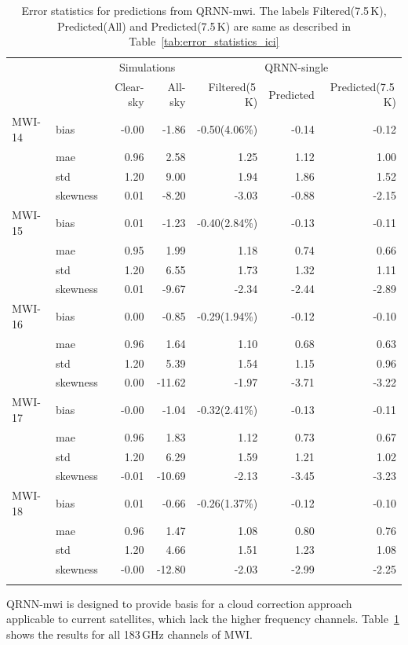 \documentclass[amt, manuscript]{copernicus}
\begin{document}
%
\begin{table}[t]
	\caption{Error statistics for predictions from QRNN-mwi. The labels Filtered(7.5\,K), Predicted(All) and Predicted(7.5\,K) are same as described in Table~\ref{tab:error_statistics_ici}}
	\label{tab:statistics_mwi-alone}
	\begin{tabular}{llrr|rrr}
		\tophline
		&&\multicolumn{2}{c|}{Simulations}& \multicolumn{3}{c}{QRNN-single} \\
		\cline{3-7}
		&&   Clear-sky &   All-sky &  Filtered(5\,K) & Predicted & Predicted(7.5\,K) \\
		\middlehline
		MWI-14 		&bias     & -0.00 & -1.86 & -0.50(4.06\%) & -0.14 & -0.12 \\
					&mae      &  0.96 &  2.58 &  1.25 &  1.12 &  1.00 \\
					&std      &  1.20 &  9.00 &  1.94 &  1.86 &  1.52 \\
					&skewness &  0.01 & -8.20 & -3.03 & -0.88 & -2.15 \\ 
		\middlehline
		MWI-15 		&bias     & 0.01 & -1.23 & -0.40(2.84\%) & -0.13 & -0.11 \\
					&mae      & 0.95 &  1.99 &  1.18 &  0.74 &  0.66 \\
					&std      & 1.20 &  6.55 &  1.73 &  1.32 &  1.11 \\
					&skewness & 0.01 & -9.67 & -2.34 & -2.44 & -2.89 \\
		\middlehline	
		MWI-16 		&bias     & 0.00 &  -0.85 & -0.29(1.94\%) & -0.12 & -0.10 \\
					&mae      & 0.96 &   1.64 &  1.10 &  0.68 &  0.63 \\
					&std      & 1.20 &   5.39 &  1.54 &  1.15 &  0.96 \\
					&skewness & 0.00 & -11.62 & -1.97 & -3.71 & -3.22 \\	
		\middlehline			
		MWI-17 		&bias     & -0.00 &  -1.04 & -0.32(2.41\%) & -0.13 & -0.11 \\
					&mae      &  0.96 &   1.83 &  1.12 &  0.73 &  0.67 \\
					&std      &  1.20 &   6.29 &  1.59 &  1.21 &  1.02 \\
					&skewness & -0.01 & -10.69 & -2.13 & -3.45 & -3.23 \\	
		\middlehline			
		MWI-18 		&bias     &  0.01 &  -0.66 & -0.26(1.37\%) & -0.12 & -0.10 \\
					&mae      &  0.96 &   1.47 &  1.08 &  0.80 &  0.76 \\
					&std      &  1.20 &   4.66 &  1.51 &  1.23 &  1.08 \\
					&skewness & -0.00 & -12.80 & -2.03 & -2.99 & -2.25 \\	
		\bottomhline				
	\end{tabular}	
	\belowtable{} %
\end{table}
QRNN-mwi is designed to provide basis for a cloud correction approach applicable to current satellites, which lack the higher frequency channels. Table~\ref{tab:statistics_mwi-alone} shows the results for all 183\,GHz channels of MWI. 
\end{document}
